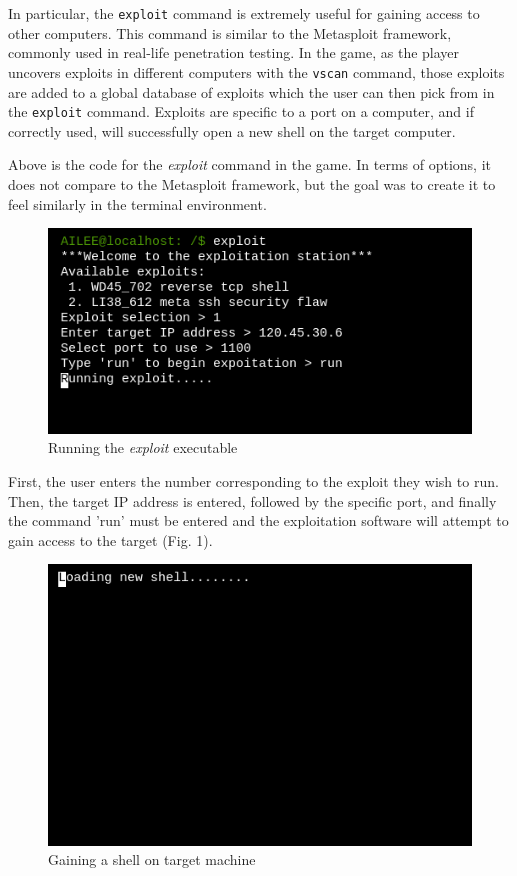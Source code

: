 \documentclass[conference]{IEEEtran}
\begin{document}
In particular, the \texttt{exploit} command is extremely useful for gaining access to other computers.  This command is similar to the Metasploit framework, commonly used in real-life penetration testing.  In the game, as the player uncovers exploits in different computers with the \texttt{vscan} command, those exploits are added to a global database of exploits which the user can then pick from in the \texttt{exploit} command.  Exploits are specific to a port on a computer, and if correctly used, will successfully open a new shell on the target computer.



Above is the code for the \textit{exploit} command in the game. In terms of options, it does not compare to the Metasploit framework, but the goal was to create it to feel similarly in the terminal environment.

\begin{figure}[htbp]
	\centerline{\includegraphics[scale=2]{exploit-pic}}
	\caption{Running the \textit{exploit} executable}
	\label{fig}
\end{figure}

First, the user enters the number corresponding to the exploit they wish to run. Then, the target IP address is entered, followed by the specific port, and finally the command 'run' must be entered and the exploitation software will attempt to gain access to the target (Fig. 1). 

\begin{figure}[htbp]
	\centerline{\includegraphics[scale=2]{loading-new-shell}}
	\caption{Gaining a shell on target machine}
	\label{fig}
\end{figure}
\end{document}

